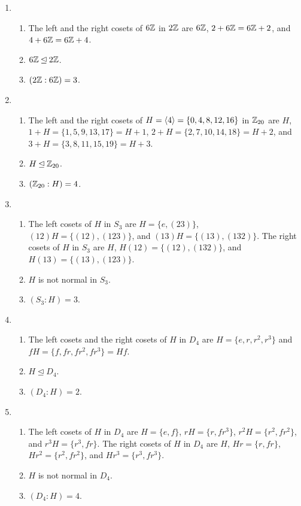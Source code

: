 \begin{solution}[print=false]
\begin{enumerate}
\item
\begin{enumerate} \item The left and the right cosets of $6\mathbb{Z}$ in $2\mathbb{Z}$ are $6\mathbb{Z}$, $2+6\mathbb{Z}=6\mathbb{Z}+2$, and $4+6\mathbb{Z}=6\mathbb{Z}+4$. \item $6\mathbb{Z} \unlhd 2\mathbb{Z}$. \item $(2\mathbb{Z}:6\mathbb{Z})=3$.\end{enumerate}
\item \begin{enumerate} \item The left and the right cosets of $H=\langle4\rangle=\{0,4,8,12,16\}$ in $\mathbb{Z}_{20}$ are $H$, $1+H=\{1,5,9,13,17\}=H+1$, $2+H=\{2,7,10,14,18\}=H+2$, and $3+H=\{3,8,11,15,19\}=H+3$. \item $H \unlhd \mathbb{Z}_{20}$. \item $(\mathbb{Z}_{20}:H)=4$.\end{enumerate}
\item  \begin{enumerate} \item The left cosets of $H$ in $S_3$ are $H=\{e,(23)\}$, $(12)H=\{(12),(123)\}$, and $(13)H=\{(13),(132)\}$. The right cosets of $H$ in $S_3$ are $H$, $H(12)=\{(12),(132)\}$, and $H(13)=\{(13),(123)\}$.   \item $H$ is not normal in $S_3$.  \item $(S_3:H)=3$. \end{enumerate}
\item  \begin{enumerate} \item The left cosets and the right cosets of $H$ in $D_4$ are $H=\{e,r,r^2,r^3\}$ and $fH=\{f,fr, fr^2, fr^3\}=Hf$. \item $H\unlhd D_4$.\item $(D_4:H)=2$. \end{enumerate}
\item \begin{enumerate} \item The left cosets of $H$ in $D_4$ are $H=\{e,f\}$, $rH=\{r,fr^3\}$, $r^2H=\{r^2,fr^2\}$, and $r^3H=\{r^3, fr\}$. The right cosets of $H$ in $D_4$ are $H$, $Hr=\{r, fr\}$, $Hr^2=\{r^2,fr^2\}$, and $Hr^3=\{r^3, fr^3\}$. \item $H$ is not normal in $D_4$.  \item $(D_4:H)=4$. \end{enumerate}
\end{enumerate}
\end{solution}


